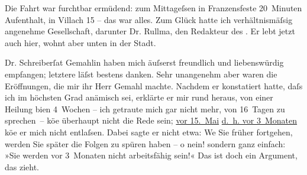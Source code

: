 \pstart
           Die Fahrt war furchtbar ermüdend: zum Mittageſsen in Franzensfeste 20 Minuten Aufenthalt, in Villach 15 – das war alles. Zum Glück hatte ich verhältnismäſsig angenehme
               Gesellschaft, darunter Dr. Rullma{\geminationn}, den Redakteur des \label{K_L00176-2v}\label{K_L00176-2}. Er lebt jetzt
               auch hier, wohnt aber unten in der Stadt.\pend
           
\pstart
           Dr. Schreiberſa{\geminationm}t Gemahlin haben mich äuſserst freundlich und
               liebenswürdig empfangen; letztere läſst bestens danken. Sehr unangenehm aber waren
               die Eröffnungen, die mir ihr Herr Gemahl machte. Nachdem er konstatiert hatte, daſs ich im höchsten Grad
               anämisch sei, erklärte er mir rund heraus, von einer Heilung bi{\geminationn}en 4 Wochen – ich getraute mich gar nicht mehr, von
               16 Tagen zu sprechen – kö{\geminationn}e überhaupt nicht die Rede
               sein; \uline{vor 15. Mai}{ }{\pb}\uline{d. h. vor 3 Monaten} kö{\geminationn}e
               er mich nicht entlaſsen. Dabei sagte er nicht etwa: We{\geminationn}
               Sie früher fortgehen, werden Sie später die Folgen zu spüren haben – o nein! sondern
               ganz einfach: »Sie werden vor 3 Monaten nicht arbeitsfähig sein!« Das ist doch ein
               Argument, das zieht.\pend
           
